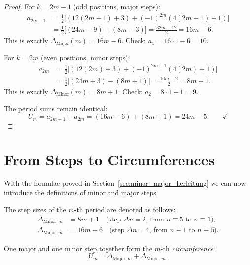 \begin{proof}
For $k = 2m-1$ (odd positions, major steps):
\begin{align*}
  a_{2m-1}
  &= \frac{1}{2}\bigl[(12(2m-1)+3) + (-1)^{2m}(4(2m-1)+1)\bigr] \\
  &= \frac{1}{2}\bigl[(24m-9) + (8m-3)\bigr]
  = \frac{32m-12}{2} = 16m-6.
\end{align*}
This is exactly $\Delta_{\mathrm{Major}}(m) = 16m-6$. \quad
Check: $a_1 = 16\cdot1-6 = 10$. \checkmark

For $k = 2m$ (even positions, minor steps):
\begin{align*}
  a_{2m}
  &= \frac{1}{2}\bigl[(12(2m)+3) + (-1)^{2m+1}(4(2m)+1)\bigr] \\
  &= \frac{1}{2}\bigl[(24m+3) - (8m+1)\bigr]
  = \frac{16m+2}{2} = 8m+1.
\end{align*}
This is exactly $\Delta_{\mathrm{Minor}}(m) = 8m+1$. \quad
Check: $a_2 = 8\cdot1+1 = 9$. \checkmark

The period sums remain identical:
\[
  U_m = a_{2m-1} + a_{2m}
      = (16m-6) + (8m+1)
      = 24m - 5. \qquad\checkmark
\]
\end{proof}

\section{From Steps to Circumferences}

With the formulae proved in Section~\ref{sec:minor_major_herleitung}
we can now introduce the definitions of minor and major steps.

\begin{definition}
The step sizes of the $m$-th period are denoted as follows:
\begin{align}
  \Delta_{\mathrm{Minor},m} &= 8m + 1 \quad
    \text{(step $\Delta n = 2$, from } n\equiv5 \text{ to } n\equiv1\text{)},\\
  \Delta_{\mathrm{Major},m} &= 16m - 6 \quad
    \text{(step $\Delta n = 4$, from } n\equiv1 \text{ to } n\equiv5\text{)}.
\end{align}
\end{definition}

\begin{definition}[Circumferences]
One major and one minor step together form the $m$-th
\emph{circumference}:
\begin{equation}
  U_m = \Delta_{\mathrm{Major},m} + \Delta_{\mathrm{Minor},m}.
\end{equation}
\end{definition}

